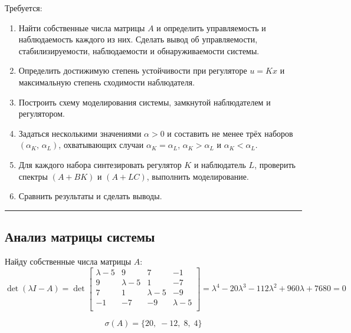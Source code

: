 \documentclass[a4paper,12pt]{article}
\begin{document}
	Требуется:
	
	\begin{enumerate}
		\item Найти собственные числа матрицы $A$ и определить управляемость
		и наблюдаемость каждого из них. Сделать вывод об управляемости,
		стабилизируемости, наблюдаемости и обнаруживаемости системы.
		
		\item Определить достижимую степень устойчивости при регуляторе $u = Kx$
		и максимальную степень сходимости наблюдателя.
		
		\item Построить схему моделирования системы, замкнутой наблюдателем
		и регулятором.
		
		\item Задаться несколькими значениями $\alpha > 0$ и составить не менее
		трёх наборов $(\alpha_K,\, \alpha_L)$, охватывающих случаи
		$\alpha_K = \alpha_L$, $\alpha_K > \alpha_L$ и $\alpha_K < \alpha_L$.
		
		\item Для каждого набора синтезировать регулятор $K$ и наблюдатель $L$,
		проверить спектры $(A + BK)$ и $(A + LC)$, выполнить моделирование.
		
		\item Сравнить результаты и сделать выводы.
	\end{enumerate}
	
	\hrule \newpage
	
	\subsection{Анализ матрицы системы}
	
	Найду собственные числа матрицы \(A\):
	\[
	\operatorname{det}(\lambda I - A) = \operatorname{det}\begin{bmatrix}
		\lambda-5 & 9 & 7 & -1 \\
		9 & \lambda-5 & 1 & -7 \\
		7 & 1 & \lambda-5 & -9 \\
		-1 & -7 & -9 & \lambda-5 \\
	\end{bmatrix} = \lambda^4 - 20\lambda^3 - 112\lambda^2 + 960\lambda + 7680 = 0
	\]
	
	\[
	\sigma(A) = \{20,\; -12,\; 8,\; 4\}
	\]
	
\end{document}
